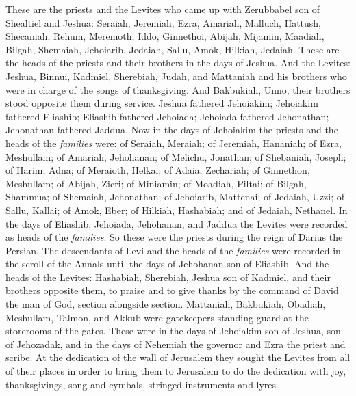 \begin{biblechapter} %
 These are the priests and the Levites who came up with Zerubbabel son of Shealtiel and Jeshua: Seraiah, Jeremiah, Ezra,
\verse Amariah, Malluch, Hattush,
\verse Shecaniah, Rehum, Meremoth,
\verse Iddo, Ginnethoi, Abijah,
\verse Mijamin, Maadiah, Bilgah,
\verse Shemaiah, Jehoiarib, Jedaiah,
\verse Sallu, Amok, Hilkiah, Jedaiah. These are the heads of the priests and their brothers in the days of Jeshua.
\verse And the Levites: Jeshua, Binnui, Kadmiel, Sherebiah, Judah, and Mattaniah and his brothers who were in charge of the songs of thanksgiving.
\verse And Bakbukiah, Unno, their brothers stood opposite them during service.
\verse Jeshua fathered Jehoiakim; Jehoiakim fathered Eliashib; Eliashib fathered Jehoiada;
\verse Jehoiada fathered Jehonathan; Jehonathan fathered Jaddua.
\verse Now in the days of Jehoiakim the priests and the heads of the \textit{families} were: of Seraiah, Meraiah; of Jeremiah, Hananiah;
\verse of Ezra, Meshullam; of Amariah, Jehohanan;
\verse of Melichu, Jonathan; of Shebaniah, Joseph;
\verse of Harim, Adna; of Meraioth, Helkai;
\verse of Adaia, Zechariah; of Ginnethon, Meshullam;
\verse of Abijah, Zicri; of Miniamin; of Moadiah, Piltai;
\verse of Bilgah, Shammua; of Shemaiah, Jehonathan;
\verse of Jehoiarib, Mattenai; of Jedaiah, Uzzi;
\verse of Sallu, Kallai; of Amok, Eber;
\verse of Hilkiah, Hashabiah; and of Jedaiah, Nethanel.
\verse In the days of Eliashib, Jehoiada, Jehohanan, and Jaddua the Levites were recorded as heads of the \textit{families}. So these were the priests during the reign of Darius the Persian.
\verse The descendants of Levi and the heads of the \textit{families} were recorded in the scroll of the Annals until the days of Jehohanan son of Eliashib.
\verse And the heads of the Levites: Hashabiah, Sherebiah, Jeshua son of Kadmiel, and their brothers opposite them, to praise and to give thanks by the command of David the man of God, section alongside section.
\verse Mattaniah, Bakbukiah, Obadiah, Meshullam, Talmon, and Akkub were gatekeepers standing guard at the storerooms of the gates.
\verse These were in the days of Jehoiakim son of Jeshua, son of Jehozadak, and in the days of Nehemiah the governor and Ezra the priest and scribe.
 At the dedication of the wall of Jerusalem they sought the Levites from all of their places in order to bring them to Jerusalem to do the dedication with joy, thanksgivings, song and cymbals, stringed instruments and lyres.

\end{biblechapter}
